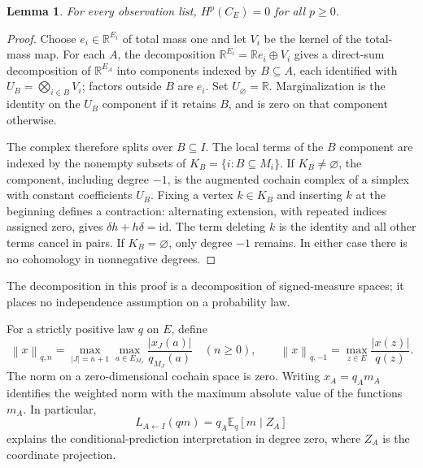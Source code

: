 \documentclass[11pt,a4paper]{article}
\numberwithin{equation}{section}
\newtheorem{lemma}[theorem]{Lemma}
\theoremstyle{remark}
\newcommand{\R}{\mathbb R}
\newcommand{\id}{\mathrm{id}}
\newcommand{\norm}[1]{\left\lVert #1\right\rVert}
\begin{document}
\begin{lemma}\label{lem:acyclic}
For every observation list, $H^p(C_E)=0$ for all $p\ge0$.
\end{lemma}
\begin{proof}
Choose $e_i\in\R^{E_i}$ of total mass one and let $V_i$ be the kernel of the total-mass map. For each $A$, the decomposition $\R^{E_i}=\R e_i\oplus V_i$ gives a direct-sum decomposition of $\R^{E_A}$ into components indexed by $B\subseteq A$, each identified with $U_B=\bigotimes_{i\in B}V_i$; factors outside $B$ are $e_i$. Set $U_\varnothing=\R$. Marginalization is the identity on the $U_B$ component if it retains $B$, and is zero on that component otherwise.

The complex therefore splits over $B\subseteq I$. The local terms of the $B$ component are indexed by the nonempty subsets of $K_B=\{i:B\subseteq M_i\}$. If $K_B\ne\varnothing$, the component, including degree $-1$, is the augmented cochain complex of a simplex with constant coefficients $U_B$. Fixing a vertex $k\in K_B$ and inserting $k$ at the beginning defines a contraction: alternating extension, with repeated indices assigned zero, gives $\delta h+h\delta=\id$. The term deleting $k$ is the identity and all other terms cancel in pairs. If $K_B=\varnothing$, only degree $-1$ remains. In either case there is no cohomology in nonnegative degrees.
\end{proof}
The decomposition in this proof is a decomposition of signed-measure spaces; it places no independence assumption on a probability law.

For a strictly positive law $q$ on $E$, define
\begin{equation}\label{eq:weighted}
 \norm{x}_{q,n}=\max_{|J|=n+1}\max_{a\in E_{M_J}}
 \frac{|x_J(a)|}{q_{M_J}(a)}\quad(n\ge0),\qquad
 \norm{x}_{q,-1}=\max_{z\in E}\frac{|x(z)|}{q(z)}.
\end{equation}
The norm on a zero-dimensional cochain space is zero. Writing $x_A=q_A m_A$ identifies the weighted norm with the maximum absolute value of the functions $m_A$. In particular,
\[
 L_{A\leftarrow I}(qm)=q_A\mathbb E_q[m\mid Z_A]
\]
explains the conditional-prediction interpretation in degree zero, where $Z_A$ is the coordinate projection.
\end{document}
